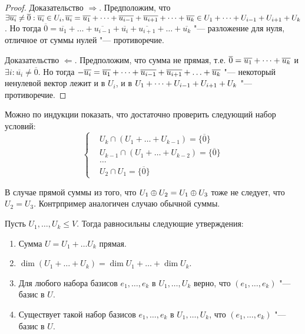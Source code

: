 \begin{proof}
	Доказательство $\Rightarrow$. Предположим, что $\exists \overline{u_i} \ne \overline{0}: \overline{u_i} \in U_i, \overline{u_i} = \overline{u_1} + \dots + \overline{u_{i-1}} + \overline{u_{i+1}} +\dots + \overline{u_k} \in U_1+\dots+U_{i-1}+U_{i+1}\hm{+}U_k$. Но тогда $\overline{0} = \overline{u_1} + \dots + \overline{u_{i-1}} + \overline{u_i} + \overline{u_{i+1}} +\dots + \overline{u_k}$ "--- разложение для нуля, отличное от суммы нулей "--- противоречие.
	
	Доказательство $\Leftarrow$. Предположим, что сумма не прямая, т.\:е. $\overline{0} \hm{=} \overline{u_1} + \dots + \overline{u_k}$ и $\exists i: \overline{u_i} \ne \overline{0}$. Но тогда $-\overline{u_i} = \overline{u_1} + \dots + \overline{u_{i-1}} + \overline{u_{i+1}} +\dots \hm{+} \overline{u_k}$ "--- некоторый ненулевой вектор лежит и в $U_i$, и в $U_1+\dots+U_{i-1}\hm{+}U_{i+1}\hm{+}U_k$ "--- противоречие.
\end{proof}

\begin{note}
	Можно по индукции показать, что достаточно проверить следующий набор условий:
	\[\left\{
	\begin{aligned}
		&U_k \cap (U_1 + \dots + U_{k-1}) = \{\overline{0}\}\\
		&U_{k-1} \cap (U_1 + \dots + U_{k-2}) = \{\overline{0}\}\\
		&\dots\\
		&U_2 \cap U_1 = \{\overline{0}\}
	\end{aligned}
	\right.\]
\end{note}

\begin{note}
	В случае прямой суммы из того, что $U_1 \oplus U_2 = U_1 \hm{\oplus} U_3$ тоже не следует, что $U_2 = U_3$. Контрпример аналогичен случаю обычной суммы.
\end{note}

\begin{theorem}
	Пусть $U_1, \dots, U_k \le V$. Тогда равносильны следующие утверждения:
	\begin{enumerate}
		\item Сумма $U = U_1 + \dots U_k$ прямая.
		\item $\dim{(U_1 + \dots + U_k)} = \dim{U_1} + \dots + \dim{U_k}$.
		\item Для любого набора базисов $e_1, \dots, e_k$ в $U_1, \dots, U_k$ верно, что $(e_1, \dots, e_k)$ "--- базис в $U$.
		\item Существует такой набор базисов $e_1, \dots, e_k$ в $U_1, \dots, U_k$, что $(e_1, \dots, e_k)$ "--- базис в $U$.
	\end{enumerate}
\end{theorem}

